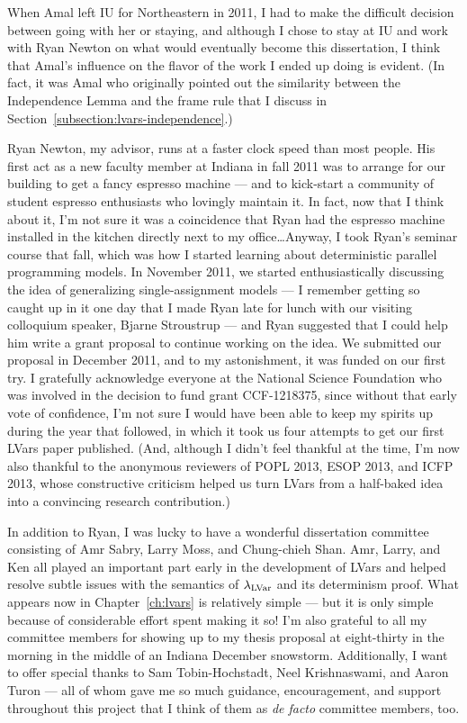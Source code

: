When Amal left IU for Northeastern in 2011, I had to make the difficult decision between going with her or staying, and although I chose to stay at IU and work with Ryan Newton on what would eventually become this dissertation, I think that Amal's influence on the flavor of the work I ended up doing is evident.  (In fact, it was Amal who originally pointed out the similarity between the Independence Lemma and the frame rule that I discuss in Section~\ref{subsection:lvars-independence}.)

Ryan Newton, my advisor, runs at a faster clock speed than most people.  His first act as a new faculty member at Indiana in fall 2011 was to arrange for our building to get a fancy espresso machine --- and to kick-start a community of student espresso enthusiasts who lovingly maintain it.  In fact, now that I think about it, I'm not sure it was a coincidence that Ryan had the espresso machine installed in the kitchen directly next to my office\dots  Anyway, I took Ryan's seminar course that fall, which was how I started learning about deterministic parallel programming models.  In November 2011, we started enthusiastically discussing the idea of generalizing single-assignment models --- I remember getting so caught up in it one day that I made Ryan late for lunch with our visiting colloquium speaker, Bjarne Stroustrup --- and Ryan suggested that I could help him write a grant proposal to continue working on the idea.  We submitted our proposal in December 2011, and to my astonishment, it was funded on our first try.  I gratefully acknowledge everyone at the National Science Foundation who was involved in the decision to fund grant CCF-1218375, since without that early vote of confidence, I'm not sure I would have been able to keep my spirits up during the year that followed, in which it took us four attempts to get our first LVars paper published.  (And, although I didn't feel thankful at the time, I'm now also thankful to the anonymous reviewers of POPL 2013, ESOP 2013, and ICFP 2013, whose constructive criticism helped us turn LVars from a half-baked idea into a convincing research contribution.)

In addition to Ryan, I was lucky to have a wonderful dissertation committee consisting of Amr Sabry, Larry Moss, and Chung-chieh Shan.  Amr, Larry, and Ken all played an important part early in the development of LVars and helped resolve subtle issues with the semantics of $\lambda_{\textrm{LVar}}$ and its determinism proof.  What appears now in Chapter~\ref{ch:lvars} is relatively simple --- but it is only simple because of considerable effort spent making it so!  I'm also grateful to all my committee members for showing up to my thesis proposal at eight-thirty in the morning in the middle of an Indiana December snowstorm.  Additionally, I want to offer special thanks to Sam Tobin-Hochstadt, Neel Krishnaswami, and Aaron Turon --- all of whom gave me so much guidance, encouragement, and support throughout this project that I think of them as \emph{de facto} committee members, too.

